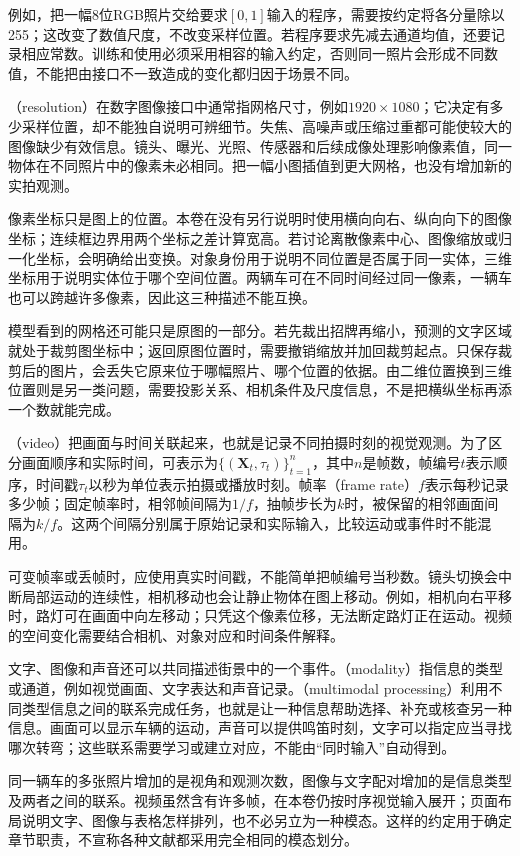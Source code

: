 例如，把一幅8位RGB照片交给要求$[0,1]$输入的程序，需要按约定将各分量除以255；这改变了数值尺度，不改变采样位置。若程序要求先减去通道均值，还要记录相应常数。训练和使用必须采用相容的输入约定，否则同一照片会形成不同数值，不能把由接口不一致造成的变化都归因于场景不同。

（resolution）在数字图像接口中通常指网格尺寸，例如$1920\times1080$；它决定有多少采样位置，却不能独自说明可辨细节。失焦、高噪声或压缩过重都可能使较大的图像缺少有效信息。镜头、曝光、光照、传感器和后续成像处理影响像素值，同一物体在不同照片中的像素未必相同。把一幅小图插值到更大网格，也没有增加新的实拍观测。

像素坐标只是图上的位置。本卷在没有另行说明时使用横向向右、纵向向下的图像坐标；连续框边界用两个坐标之差计算宽高。若讨论离散像素中心、图像缩放或归一化坐标，会明确给出变换。对象身份用于说明不同位置是否属于同一实体，三维坐标用于说明实体位于哪个空间位置。两辆车可在不同时间经过同一像素，一辆车也可以跨越许多像素，因此这三种描述不能互换。

模型看到的网格还可能只是原图的一部分。若先裁出招牌再缩小，预测的文字区域就处于裁剪图坐标中；返回原图位置时，需要撤销缩放并加回裁剪起点。只保存裁剪后的图片，会丢失它原来位于哪幅照片、哪个位置的依据。由二维位置换到三维位置则是另一类问题，需要投影关系、相机条件及尺度信息，不是把横纵坐标再添一个数就能完成。

（video）把画面与时间关联起来，也就是记录不同拍摄时刻的视觉观测。为了区分画面顺序和实际时间，可表示为$\{(\bm{X}_t,\tau_t)\}_{t=1}^{n}$，其中$n$是帧数，帧编号$t$表示顺序，时间戳$\tau_t$以秒为单位表示拍摄或播放时刻。帧率（frame rate）$f$表示每秒记录多少帧；固定帧率时，相邻帧间隔为$1/f$，抽帧步长为$k$时，被保留的相邻画面间隔为$k/f$。这两个间隔分别属于原始记录和实际输入，比较运动或事件时不能混用。

可变帧率或丢帧时，应使用真实时间戳，不能简单把帧编号当秒数。镜头切换会中断局部运动的连续性，相机移动也会让静止物体在图上移动。例如，相机向右平移时，路灯可在画面中向左移动；只凭这个像素位移，无法断定路灯正在运动。视频的空间变化需要结合相机、对象对应和时间条件解释。

文字、图像和声音还可以共同描述街景中的一个事件。（modality）指信息的类型或通道，例如视觉画面、文字表达和声音记录。（multimodal processing）利用不同类型信息之间的联系完成任务，也就是让一种信息帮助选择、补充或核查另一种信息。画面可以显示车辆的运动，声音可以提供鸣笛时刻，文字可以指定应当寻找哪次转弯；这些联系需要学习或建立对应，不能由“同时输入”自动得到。

同一辆车的多张照片增加的是视角和观测次数，图像与文字配对增加的是信息类型及两者之间的联系。视频虽然含有许多帧，在本卷仍按时序视觉输入展开；页面布局说明文字、图像与表格怎样排列，也不必另立为一种模态。这样的约定用于确定章节职责，不宣称各种文献都采用完全相同的模态划分。

